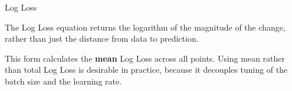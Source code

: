 \begin{frame}{Log Loss}
  \begin{withmargin}
    \begin{tdmargin}
      The Log Loss equation returns the logarithm of the magnitude of the
      change, rather than just the distance from data to prediction.
      \par\medskip
      This form calculates the \textbf{mean} Log Loss across all points. Using
      mean rather than total Log Loss is desirable in practice, because it
      decouples tuning of the batch size and the learning rate.
    \end{tdmargin}
  \end{withmargin}
\end{frame}

